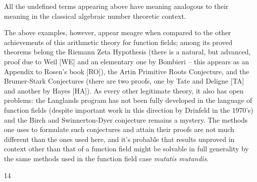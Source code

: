 \documentclass[11pt]{article}
\theoremstyle{scplain}
\begin{document}
All the undefined terms appearing above have meaning analogous to their meaning
in the classical algebraic number theoretic context.

The above examples, however, appear meagre when compared to the other
achievements of this arithmetic theory for function fields; among its proved
theorems belong the Riemann Zeta Hypothesis (there is a natural, but advanced,
proof due to Weil [WE] and an elementary one by Bombieri -- this appears as an
Appendix to Rosen's book [RO]), the Artin Primitive Roots Conjecture, and the
Brumer-Stark Conjectures (there are two proofs, one by Tate and Deligne [TA] and
another by Hayes [HA]). As every other legitimate theory, it also has open
problems: the Langlands program has not been fully developed in the language of
function fields (despite important work in this direction by Drinfeld in the
1970's) and the Birch and Swinnerton-Dyer conjecture remains a mystery. The
methods one uses to formulate such conjectures and attain their proofs are not
much different than the ones used here, and it's probable that results unproved
in context other than that of a function field might be solvable in full
generality by the same methods used in the function field case \emph{mutatis
mutandis}.

\begin{center}14\end{center}
\end{document}
